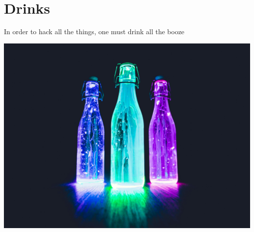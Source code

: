 \chapter{Drinks}

In order to hack all the things, one must drink all the booze

\centering
\includegraphics{images/pexels-photo-274131.jpg}
